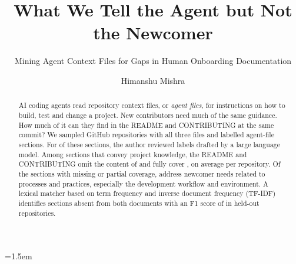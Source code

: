 \documentclass[sigconf,nonacm]{acmart}
\begin{document}
\setcounter{dbltopnumber}{3}\renewcommand{\dbltopfraction}{0.85}\renewcommand{\dblfloatpagefraction}{0.8}
\setcounter{topnumber}{3}\renewcommand{\topfraction}{0.85}\renewcommand{\floatpagefraction}{0.8}
\emergencystretch=1.5em

\title{What We Tell the Agent but Not the Newcomer}
\subtitle{Mining Agent Context Files for Gaps in Human Onboarding Documentation}

\author{Himanshu Mishra}

\begin{abstract}
AI coding agents read repository context files, or \emph{agent files}, for instructions on how to
build, test and change a project. New contributors need much of the same guidance. How much of it
can they find in the README and CONTRIBUTING at the same commit? We sampled \nSampleRepos{} GitHub
repositories with all three files and labelled \nQueued{} agent-file sections. For
\draftedLabelShare{} of these sections, the author reviewed labels drafted by a large language
model. Among sections that convey project knowledge, the README and CONTRIBUTING omit the content
of \agentOnlyOverall{} and fully cover \sharedOverall{}, on average per repository. Of the sections
with missing or partial coverage, \needGroupTopShare{} address newcomer needs related to processes
and practices, especially the development workflow and environment. A lexical matcher based on
term frequency and inverse document frequency (TF-IDF) identifies sections absent from both
documents with an F1 score of \detectorFOne{} in held-out repositories.
\end{abstract}



\maketitle

\end{document}
